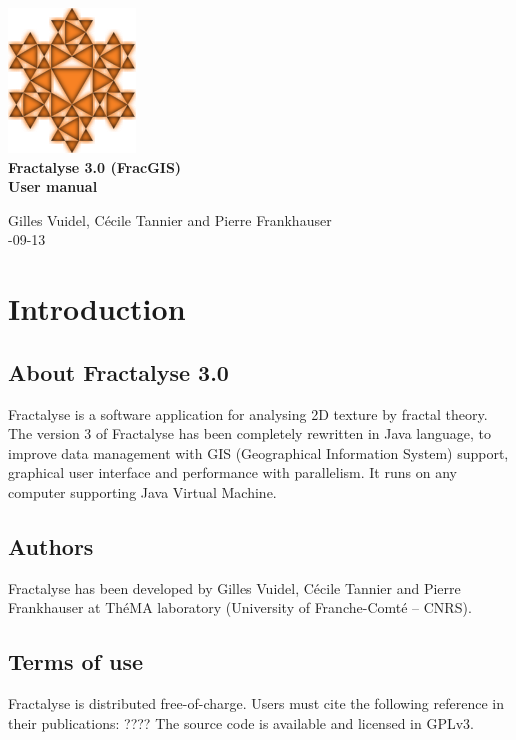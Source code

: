 \documentclass[a4paper,10pt]{report}
\begin{document}
\begin{titlepage}
	
	\centering
	\includegraphics[scale=0.5]{img/logo.png}\\
	
	\bigskip
	\bigskip
	\bigskip	
	{\Huge
		\bfseries
		Fractalyse 3.0 (FracGIS)\\
		\bigskip
		User manual\\
	}
	\bigskip
	\bigskip
	\bigskip
	\bigskip
	\bigskip
	
	{\Large		
		Gilles Vuidel, Cécile Tannier and Pierre Frankhauser\\
		-09-13\\
	}
	
\end{titlepage}

\parindent 0pt

\tableofcontents

\chapter{Introduction}
\section{About Fractalyse 3.0}
Fractalyse is a software application for analysing 2D texture by fractal theory. 
The version 3 of Fractalyse has been completely rewritten in Java language, to improve data management with GIS (Geographical Information System) support, graphical user interface and performance with parallelism. It runs on any computer supporting Java Virtual Machine.
\section{Authors}
Fractalyse has been developed by Gilles Vuidel, Cécile Tannier and Pierre Frankhauser at ThéMA laboratory (University of Franche-Comté – CNRS). 
\section{Terms of use}
Fractalyse is distributed free-of-charge. Users must cite the following reference in their publications:
????
The source code is available and licensed in GPLv3.
\end{document}

